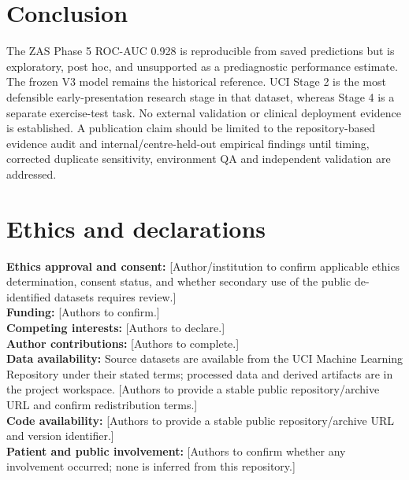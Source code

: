 \documentclass[11pt]{article}
\begin{document}
\section{Conclusion}
The ZAS Phase 5 ROC-AUC 0.928 is reproducible from saved predictions but is exploratory, post hoc, and unsupported as a prediagnostic performance estimate. The frozen V3 model remains the historical reference. UCI Stage 2 is the most defensible early-presentation research stage in that dataset, whereas Stage 4 is a separate exercise-test task. No external validation or clinical deployment evidence is established. A publication claim should be limited to the repository-based evidence audit and internal/centre-held-out empirical findings until timing, corrected duplicate sensitivity, environment QA and independent validation are addressed.

\section*{Ethics and declarations}
\textbf{Ethics approval and consent:} [Author/institution to confirm applicable ethics determination, consent status, and whether secondary use of the public de-identified datasets requires review.]\\
\textbf{Funding:} [Authors to confirm.]\\
\textbf{Competing interests:} [Authors to declare.]\\
\textbf{Author contributions:} [Authors to complete.]\\
\textbf{Data availability:} Source datasets are available from the UCI Machine Learning Repository under their stated terms; processed data and derived artifacts are in the project workspace. [Authors to provide a stable public repository/archive URL and confirm redistribution terms.]\\
\textbf{Code availability:} [Authors to provide a stable public repository/archive URL and version identifier.]\\
\textbf{Patient and public involvement:} [Authors to confirm whether any involvement occurred; none is inferred from this repository.]



\end{document}
